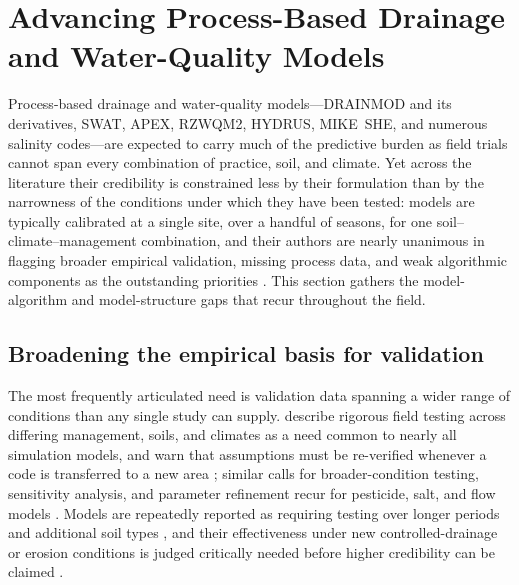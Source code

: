\documentclass[11pt]{article}
\begin{document}
\section*{Advancing Process-Based Drainage and Water-Quality Models}

Process-based drainage and water-quality models---DRAINMOD and its
derivatives, SWAT, APEX, RZWQM2, HYDRUS, MIKE~SHE, and numerous salinity
codes---are expected to carry much of the predictive burden as field trials
cannot span every combination of practice, soil, and climate. Yet across the
literature their credibility is constrained less by their formulation than by
the narrowness of the conditions under which they have been tested: models are
typically calibrated at a single site, over a handful of seasons, for one
soil--climate--management combination, and their authors are nearly unanimous
in flagging broader empirical validation, missing process data, and weak
algorithmic components as the outstanding priorities
\parencite{Li2006,Qi2015,Youssef2006,Radcliffe2015,SKAGGS1994}. This section
gathers the model-algorithm and model-structure gaps that recur throughout the
field.

\subsection{Broadening the empirical basis for validation}

The most frequently articulated need is validation data spanning a wider range
of conditions than any single study can supply. \textcite{Youssef2006} describe
rigorous field testing across differing management, soils, and climates as a
need common to nearly all simulation models, and warn that assumptions must be
re-verified whenever a code is transferred to a new area
\parencite{Kelleners2000}; similar calls for broader-condition testing,
sensitivity analysis, and parameter refinement recur for pesticide, salt, and
flow models \parencite{Branger2009,Hirekhan2007,Yang2008b,Xian2017}. Models are
repeatedly reported as requiring testing over longer periods and additional soil
types \parencite{Salazar2009,Li2026}, and their effectiveness under new
controlled-drainage or erosion conditions is judged critically needed before
higher credibility can be claimed \parencite{Negm2017,Turunen2020}.
\end{document}
